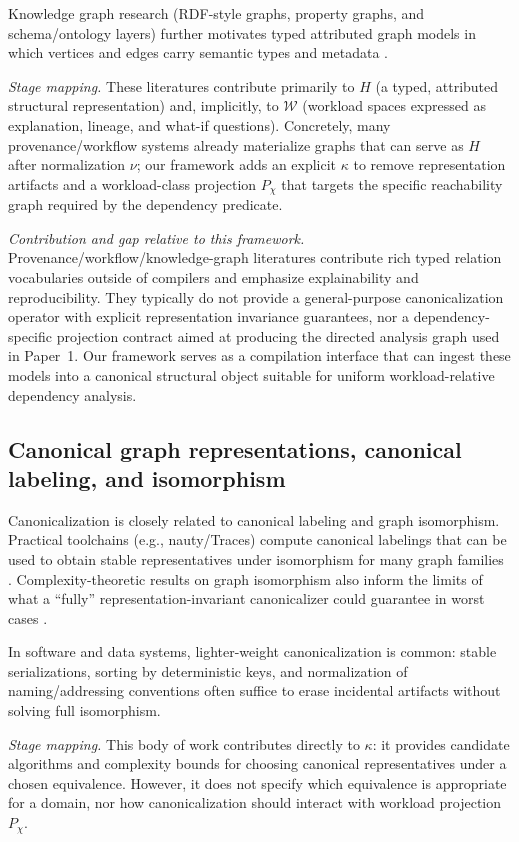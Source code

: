 \documentclass[11pt]{article}
\begin{document}
Knowledge graph research (RDF-style graphs, property graphs, and schema/ontology layers) further motivates typed attributed graph models in which vertices and edges carry semantic types and metadata \cite{hogan2021}.

\emph{Stage mapping.} These literatures contribute primarily to $H$ (a typed, attributed structural representation) and, implicitly, to $\mathcal W$ (workload spaces expressed as explanation, lineage, and what-if questions). Concretely, many provenance/workflow systems already materialize graphs that can serve as $H$ after normalization $\nu$; our framework adds an explicit $\kappa$ to remove representation artifacts and a workload-class projection $P_\chi$ that targets the specific reachability graph required by the dependency predicate.

\emph{Contribution and gap relative to this framework.} Provenance/workflow/knowledge-graph literatures contribute rich typed relation vocabularies outside of compilers and emphasize explainability and reproducibility. They typically do not provide a general-purpose canonicalization operator with explicit representation invariance guarantees, nor a dependency-specific projection contract aimed at producing the directed analysis graph used in Paper~1. Our framework serves as a compilation interface that can ingest these models into a canonical structural object suitable for uniform workload-relative dependency analysis.

\subsection{Canonical graph representations, canonical labeling, and isomorphism}
Canonicalization is closely related to canonical labeling and graph isomorphism. Practical toolchains (e.g., nauty/Traces) compute canonical labelings that can be used to obtain stable representatives under isomorphism for many graph families \cite{mckay2014}. Complexity-theoretic results on graph isomorphism also inform the limits of what a ``fully'' representation-invariant canonicalizer could guarantee in worst cases \cite{babai2016}.

In software and data systems, lighter-weight canonicalization is common: stable serializations, sorting by deterministic keys, and normalization of naming/addressing conventions often suffice to erase incidental artifacts without solving full isomorphism.

\emph{Stage mapping.} This body of work contributes directly to $\kappa$: it provides candidate algorithms and complexity bounds for choosing canonical representatives under a chosen equivalence. However, it does not specify which equivalence is appropriate for a domain, nor how canonicalization should interact with workload projection $P_\chi$.
\end{document}
